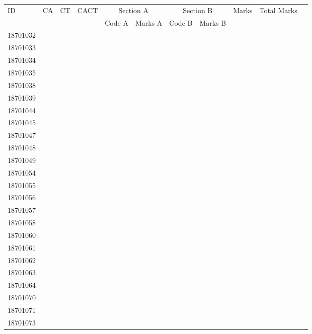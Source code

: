 \documentclass[12pt]{article}
\begin{document}
    \begin{center} 
	\renewcommand{\arraystretch}{1.08}
	\begin{small}
    \begin{tabular}{|l|c|c|c|c|c|c|c|c|c|c|} \hline
	\multirow{2}{*}{ID} & 	\multirow{2}{*}{CA}  & 	\multirow{2}{*}{CT}  & 	\multirow{2}{*}{CACT}  & \multicolumn{2 }{c|}{Section A}& \multicolumn{2 }{c|}{Section B} & 	\multirow{2}{*}{Marks}  & 	\multirow{2}{*}{Total Marks}  \\ 
	&  &  &  & Code A & Marks A & Code B & Marks B&  &  \\ \hline
18701032 &  &  &  &  &  &  &  &  & \\ \hline 
18701033 &  &  &  &  &  &  &  &  & \\ \hline 
18701034 &  &  &  &  &  &  &  &  & \\ \hline 
18701035 &  &  &  &  &  &  &  &  & \\ \hline 
18701038 &  &  &  &  &  &  &  &  & \\ \hline 
18701039 &  &  &  &  &  &  &  &  & \\ \hline 
18701044 &  &  &  &  &  &  &  &  & \\ \hline 
18701045 &  &  &  &  &  &  &  &  & \\ \hline 
18701047 &  &  &  &  &  &  &  &  & \\ \hline 
18701048 &  &  &  &  &  &  &  &  & \\ \hline 
18701049 &  &  &  &  &  &  &  &  & \\ \hline 
18701054 &  &  &  &  &  &  &  &  & \\ \hline 
18701055 &  &  &  &  &  &  &  &  & \\ \hline 
18701056 &  &  &  &  &  &  &  &  & \\ \hline 
18701057 &  &  &  &  &  &  &  &  & \\ \hline 
18701058 &  &  &  &  &  &  &  &  & \\ \hline 
18701060 &  &  &  &  &  &  &  &  & \\ \hline 
18701061 &  &  &  &  &  &  &  &  & \\ \hline 
18701062 &  &  &  &  &  &  &  &  & \\ \hline 
18701063 &  &  &  &  &  &  &  &  & \\ \hline 
18701064 &  &  &  &  &  &  &  &  & \\ \hline 
18701070 &  &  &  &  &  &  &  &  & \\ \hline 
18701071 &  &  &  &  &  &  &  &  & \\ \hline 
18701073 &  &  &  &  &  &  &  &  & \\ \hline 

\end{tabular}
\end{small}
\end{center}
\end{document}

